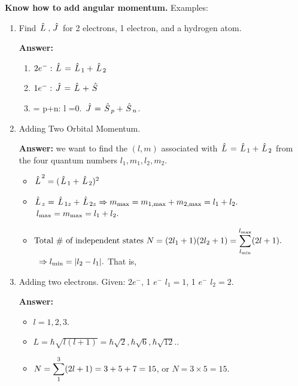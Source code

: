 \documentclass{school-22.101-notes}
\begin{document}
\textbf{Know how to add angular momentum.} 
Examples:
\begin{enumerate}
\item Find $\left. \hat{L} \right., \left. \hat{J} \right.$ for 2 electrons, 1 electron, and a hydrogen atom. 

\textbf{Answer:} 
\begin{enumerate}
\item $2e^-: \left. \hat{L} \right. = \left. \hat{L} \right._1 + \left. \hat{L} \right._2 $ 
\item $ 1 e^-: \left. \hat{J} \right. = \left. \hat{L} \right. + \left. \hat{S} \right.$
\item {} = p+n: l =0. $\left. \hat{J} \right. = \left. \hat{S} \right._p + \left. \hat{S} \right._n$. 
\end{enumerate}

\item Adding Two Orbital Momentum.  

\textbf{Answer:} we want to find the $(l,m)$ associated with $\left. \hat{L} \right.= \left. \hat{L} \right._1 + \left. \hat{L} \right._2$ from the four quantum numbers $l_1, m_1, l_2, m_2$. 
\begin{itemize}
\item $\left. \hat{L} \right.^2 = (\left. \hat{L} \right._1 + \left. \hat{L} \right._2)^2 $
\item $ \left. \hat{L} \right._z = \left. \hat{L} \right._{1z} + \left. \hat{L} \right._{2z} \Rightarrow m_{\mathrm{max}} = m_{\mathrm{1,max}} + m_{\mathrm{2,max}} = l_1 + l_2.$
$\mbox{ } l_{\mathrm{max}} = m_{\mathrm{max}} = l_1 + l_2.$
\item $ \mbox{Total \# of independent states } N = (2 l_1 + 1) (2l_2 + 1) = \displaystyle\sum_{l_{\mathrm{min}}}^{l_{\mathrm{max}}} (2l+1).$
$\mbox{ }\Rightarrow l_{\mathrm{min}} = |l_2 - l_1 |.$ That is,
\end{itemize}


\item Adding two electrons. Given: $ 2e^-$, 1 $e^-$ \@ $l_1 = 1$, 1 $e^-$ \@ $l_2 = 2$. 

\textbf{Answer:}
\begin{itemize}
\item $l = 1,2,3$.
\item $L = \hbar \sqrt{l (l+1)} = \hbar \sqrt{2}, \hbar \sqrt{6}, \hbar \sqrt{12}.$.
\item $N = \displaystyle\sum_1^3 (2l+1) = 3 + 5 + 7 = 15$, or $N = 3 \times 5 = 15$. 
\end{itemize}
\end{enumerate}
\end{document}
